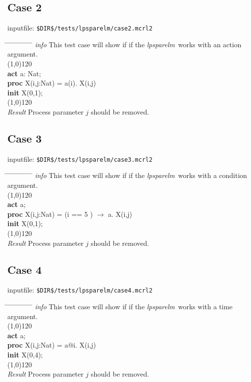 \documentclass[a4paper,10pt]{article}
\theoremstyle{plain}
\theoremstyle{definition}
\newcommand{\tool}{\textit{lpsparelm}}
\newcommand{\ti}{\textit}
\newcommand{\tb}{\textbf}
\newcommand{\tabw}{\hspace*{15.mm} \= \hspace*{20.mm} \= \hspace*{5.mm} \= \hspace*{5.mm} \= \hspace*{5.mm} \= \hspace*{5.mm}  \= \hspace*{5.mm}  \= \hspace*{5.mm}  \= \hspace*{5.mm} \= \hspace*{5.mm} \= \hspace*{5.mm}  \= \hspace*{5.mm}  \= \hspace*{5.mm}\kill}
\begin{document}
\subsection*{Case 2}
inputfile: \verb"$DIR$/tests/lpsparelm/case2.mcrl2"
\begin{tabbing}
\tabw
\ti{info} \> This test case will show if if the \tool\ works with an action argument.\\
\line(1,0){120}\\
\tb{act} \> a: Nat; \\
\tb{proc} \> X(i,j:Nat) = \> a(i). X(i,j)\\
\tb{init} \> X(0,1); \\  
\line(1,0){120}\\
\ti{Result} \> Process parameter $j$ should be removed.\\ 
\end{tabbing}

\subsection*{Case 3}
inputfile: \verb"$DIR$/tests/lpsparelm/case3.mcrl2"
\begin{tabbing}
\tabw
\ti{info} \> This test case will show if if the \tool\ works with a condition argument.\\
\line(1,0){120}\\
\tb{act} \> a; \\
\tb{proc} \> X(i,j:Nat) = \> (i == 5 ) $\rightarrow$ a. X(i,j)\\
\tb{init} \> X(0,1); \\  
\line(1,0){120}\\
\ti{Result} \> Process parameter $j$ should be removed.\\ 
\end{tabbing}

\subsection*{Case 4}
inputfile: \verb"$DIR$/tests/lpsparelm/case4.mcrl2"
\begin{tabbing}
\tabw
\ti{info} \> This test case will show if if the \tool\ works with a time argument.\\
\line(1,0){120}\\
\tb{act} \> a; \\
\tb{proc} \> X(i,j:Nat) = \> a$@$i. X(i,j)\\
\tb{init} \> X(0,4); \\  
\line(1,0){120}\\
\ti{Result} \> Process parameter $j$ should be removed.\\ 
\end{tabbing}
\end{document}
